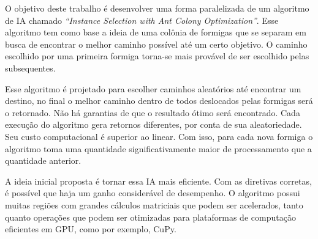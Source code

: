 O objetivo deste trabalho é desenvolver uma forma paralelizada de um algoritmo de IA chamado \emph{``Instance Selection with Ant Colony Optimization''}. Esse algoritmo tem como
base a ideia de uma colônia de formigas que se separam em busca de encontrar o melhor caminho
possível até um certo objetivo. O caminho escolhido por uma primeira formiga torna-se mais provável de ser escolhido
pelas subsequentes.

Esse algoritmo é projetado para escolher caminhos aleatórios até encontrar um destino, no final o melhor caminho dentro de todos deslocados pelas formigas
será o retornado. Não há garantias de que o resultado ótimo será encontrado. Cada execução do algoritmo gera retornos diferentes, por conta
de sua aleatoriedade. Seu custo computacional é superior ao linear. Com isso, para cada nova formiga o algoritmo toma uma quantidade
significativamente maior de processamento que a quantidade anterior.

A ideia inicial proposta é tornar essa IA mais eficiente. Com as diretivas corretas, é possível que haja um ganho considerável de 
desempenho. O algoritmo possui muitas regiões com grandes cálculos matriciais que podem ser acelerados, tanto quanto operações que
podem ser otimizadas para plataformas de computação eficientes em GPU, como por exemplo, CuPy.

